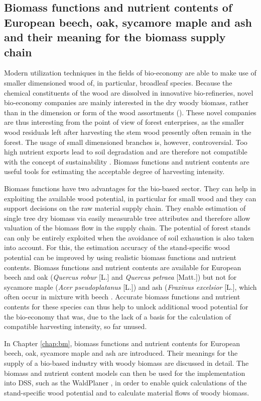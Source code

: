 \subsection{Biomass functions and nutrient contents of European beech, oak, sycamore maple and ash and their meaning for the biomass supply chain}
\label{subsec:intro:struct:bm}
Modern utilization techniques in the fields of bio-economy are able to make use of smaller dimensioned wood of, in particular, broadleaf species. Because the chemical constituents of the wood are dissolved in innovative bio-refineries, novel bio-economy companies are mainly interested in the dry woody biomass, rather than in the dimension or form of the wood assortments (\citep{ekman_2013}). These novel companies are thus interesting from the point of view of forest enterprises, as the smaller wood residuals left after harvesting the stem wood presently often remain in the forest. The usage of small dimensioned branches is, however, controversial. Too high nutrient exports lead to soil degradation and are therefore not compatible with the concept of sustainability \citep[p. 261]{pretzsch_2014}. Biomass functions and nutrient contents are useful tools for estimating the acceptable degree of harvesting intensity.

Biomass functions have two advantages for the bio-based sector. They can help in exploiting the available wood potential, in particular for small wood and they can support decisions on the raw material supply chain. They enable estimation of single tree dry biomass via easily measurable tree attributes and therefore allow valuation of the biomass flow in the supply chain. The potential of forest stands can only be entirely exploited when the avoidance of soil exhaustion is also taken into account. For this, the estimation accuracy of the stand-specific wood potential can be improved by using realistic biomass functions and nutrient contents. Biomass functions and nutrient contents are available for European beech and oak (\textit{Quercus robur} [L.] and \textit{Quercus petraea} [Matt.]) but not for sycamore maple (\textit{Acer pseudoplatanus} [L.]) and ash (\textit{Fraxinus excelsior} [L.], which often occur in mixture with beech \citep{ti_2014}. Accurate biomass functions and nutrient contents for these species can thus help to unlock additional wood potential for the bio-economy that was, due to the lack of a basis for the calculation of compatible harvesting intensity, so far unused.

In Chapter \ref{chap:bm}, biomass functions and nutrient contents for European beech, oak, sycamore maple and ash are introduced. Their meanings for the supply of a bio-based industry with woody biomass are discussed in detail. The biomass and nutrient content models can then be used for the implementation into DSS, such as the WaldPlaner \citep{hansen_2014}, in order to enable quick calculations of the stand-specific wood potential and to calculate material flows of woody biomass.

